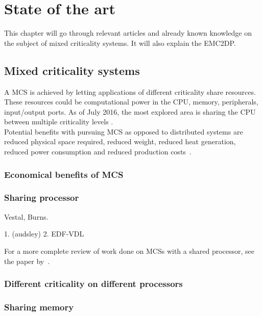\chapter{State of the art}
This chapter will go through relevant articles and already known knowledge on the subject of mixed criticality systems. It will also explain the EMC2DP.

\section{Mixed criticality systems}
A MCS is achieved by letting applications of different criticality share resources. These resources could be computational power in the CPU, memory, peripherals, input/output ports. As of July 2016, the most explored area is sharing the CPU between multiple criticality levels \cite{burns2016}. \\

Potential benefits with pursuing MCS as opposed to distributed systems are reduced physical space required, reduced weight, reduced heat generation, reduced power consumption and reduced production costs~\cite{burns2016}. %

\subsection{Economical benefits of MCS}

\subsection{Sharing processor}
Vestal, Burns.

1. (audsley) 2. EDF-VDL

For a more complete review of work done on MCSs with a shared processor, see the paper by~\cite{burns2016}.

\subsection{Different criticality on different processors}


\subsection{Sharing memory}

